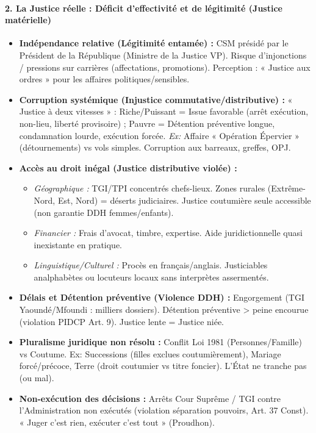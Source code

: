 \documentclass[11pt]{article}
\begin{document}
\begin{exoresolu}
    \paragraph{2. La Justice réelle : Déficit d'effectivité et de légitimité (Justice matérielle)}
    \begin{itemize}
        \item \textbf{Indépendance relative (Légitimité entamée) :} CSM présidé par le Président de la République (Ministre de la Justice VP). Risque d'injonctions / pressions sur carrières (affectations, promotions). Perception : « Justice aux ordres » pour les affaires politiques/sensibles.
        \item \textbf{Corruption systémique (Injustice commutative/distributive) :} « Justice à deux vitesses » : Riche/Puissant = Issue favorable (arrêt exécution, non-lieu, liberté provisoire) ; Pauvre = Détention préventive longue, condamnation lourde, exécution forcée. \emph{Ex:} Affaire « Opération Épervier » (détournements) vs vols simples. Corruption aux barreaux, greffes, OPJ.
        \item \textbf{Accès au droit inégal (Justice distributive violée) :} 
            \begin{itemize}
                \item \emph{Géographique :} TGI/TPI concentrés chefs-lieux. Zones rurales (Extrême-Nord, Est, Nord) = déserts judiciaires. Justice coutumière seule accessible (non garantie DDH femmes/enfants).
                \item \emph{Financier :} Frais d'avocat, timbre, expertise. Aide juridictionnelle quasi inexistante en pratique.
                \item \emph{Linguistique/Culturel :} Procès en français/anglais. Justiciables analphabètes ou locuteurs locaux sans interprètes assermentés.
            \end{itemize}
        \item \textbf{Délais et Détention préventive (Violence DDH) :} Engorgement (TGI Yaoundé/Mfoundi : milliers dossiers). Détention préventive > peine encourue (violation PIDCP Art. 9). Justice lente = Justice niée.
        \item \textbf{Pluralisme juridique non résolu :} Conflit Loi 1981 (Personnes/Famille) vs Coutume. Ex: Successions (filles exclues coutumièrement), Mariage forcé/précoce, Terre (droit coutumier vs titre foncier). L'État ne tranche pas (ou mal).
        \item \textbf{Non-exécution des décisions :} Arrêts Cour Suprême / TGI contre l'Administration non exécutés (violation séparation pouvoirs, Art. 37 Const). « Juger c'est rien, exécuter c'est tout » (Proudhon).
    \end{itemize}

\end{exoresolu}
\end{document}

